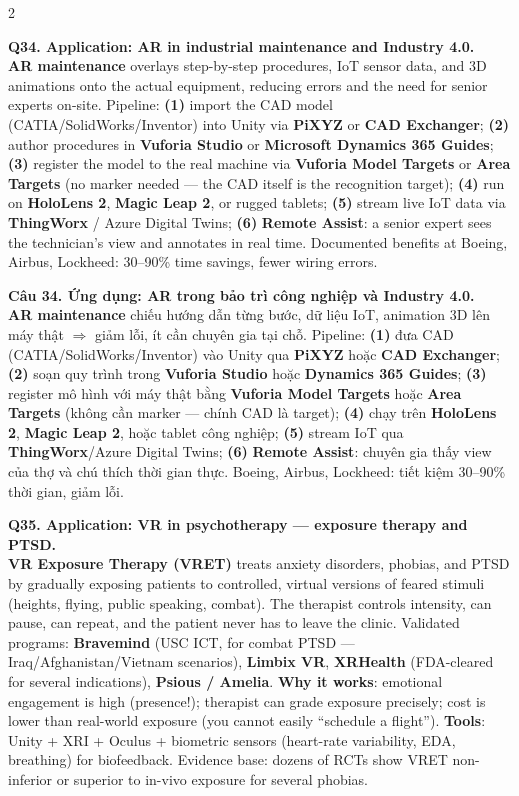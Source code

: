 \begin{paracol}{2}
\switchcolumn*

\textbf{Q34. Application: AR in industrial maintenance and Industry 4.0.}\\
\textbf{AR maintenance} overlays step-by-step procedures, IoT sensor data, and 3D animations onto the actual equipment, reducing errors and the need for senior experts on-site. Pipeline: \textbf{(1)} import the CAD model (CATIA/SolidWorks/Inventor) into Unity via \textbf{PiXYZ} or \textbf{CAD Exchanger}; \textbf{(2)} author procedures in \textbf{Vuforia Studio} or \textbf{Microsoft Dynamics 365 Guides}; \textbf{(3)} register the model to the real machine via \textbf{Vuforia Model Targets} or \textbf{Area Targets} (no marker needed --- the CAD itself is the recognition target); \textbf{(4)} run on \textbf{HoloLens 2}, \textbf{Magic Leap 2}, or rugged tablets; \textbf{(5)} stream live IoT data via \textbf{ThingWorx} / Azure Digital Twins; \textbf{(6)} \textbf{Remote Assist}: a senior expert sees the technician's view and annotates in real time. Documented benefits at Boeing, Airbus, Lockheed: 30--90\% time savings, fewer wiring errors.

\switchcolumn

\textbf{Câu 34. Ứng dụng: AR trong bảo trì công nghiệp và Industry 4.0.}\\
\textbf{AR maintenance} chiếu hướng dẫn từng bước, dữ liệu IoT, animation 3D lên máy thật $\Rightarrow$ giảm lỗi, ít cần chuyên gia tại chỗ. Pipeline: \textbf{(1)} đưa CAD (CATIA/SolidWorks/Inventor) vào Unity qua \textbf{PiXYZ} hoặc \textbf{CAD Exchanger}; \textbf{(2)} soạn quy trình trong \textbf{Vuforia Studio} hoặc \textbf{Dynamics 365 Guides}; \textbf{(3)} register mô hình với máy thật bằng \textbf{Vuforia Model Targets} hoặc \textbf{Area Targets} (không cần marker --- chính CAD là target); \textbf{(4)} chạy trên \textbf{HoloLens 2}, \textbf{Magic Leap 2}, hoặc tablet công nghiệp; \textbf{(5)} stream IoT qua \textbf{ThingWorx}/Azure Digital Twins; \textbf{(6)} \textbf{Remote Assist}: chuyên gia thấy view của thợ và chú thích thời gian thực. Boeing, Airbus, Lockheed: tiết kiệm 30--90\% thời gian, giảm lỗi.

\switchcolumn*

\textbf{Q35. Application: VR in psychotherapy --- exposure therapy and PTSD.}\\
\textbf{VR Exposure Therapy (VRET)} treats anxiety disorders, phobias, and PTSD by gradually exposing patients to controlled, virtual versions of feared stimuli (heights, flying, public speaking, combat). The therapist controls intensity, can pause, can repeat, and the patient never has to leave the clinic. Validated programs: \textbf{Bravemind} (USC ICT, for combat PTSD --- Iraq/Afghanistan/Vietnam scenarios), \textbf{Limbix VR}, \textbf{XRHealth} (FDA-cleared for several indications), \textbf{Psious / Amelia}. \textbf{Why it works}: emotional engagement is high (presence!); therapist can grade exposure precisely; cost is lower than real-world exposure (you cannot easily ``schedule a flight''). \textbf{Tools}: Unity + XRI + Oculus + biometric sensors (heart-rate variability, EDA, breathing) for biofeedback. Evidence base: dozens of RCTs show VRET non-inferior or superior to in-vivo exposure for several phobias.


\end{paracol}
